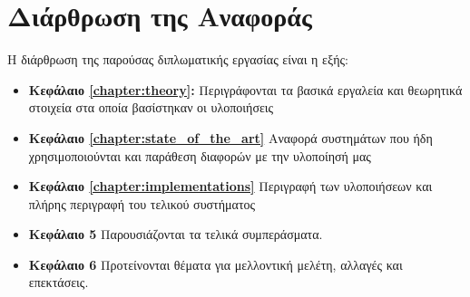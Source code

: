 \section{Διάρθρωση της Αναφοράς}
\label{section:layout}

Η διάρθρωση της παρούσας διπλωματικής εργασίας είναι η εξής:

\begin{itemize}
  \item{\textbf{Κεφάλαιο \ref{chapter:theory}:} 
		Περιγράφονται τα βασικά εργαλεία και θεωρητικά στοιχεία
		στα οποία βασίστηκαν οι υλοποιήσεις
    }
  \item{\textbf{Κεφάλαιο \ref{chapter:state_of_the_art}} Αναφορά συστημάτων που ήδη χρησιμοποιούνται	
		και παράθεση διαφορών με την υλοποίησή μας
    }
  \item{\textbf{Κεφάλαιο \ref{chapter:implementations}} Περιγραφή των υλοποιήσεων
  		και πλήρης περιγραφή του τελικού συστήματος
    }
  \item{\textbf{Κεφάλαιο 5} Παρουσιάζονται τα τελικά συμπεράσματα.
    }
  \item{\textbf{Κεφάλαιο 6} Προτείνονται θέματα για μελλοντική
      μελέτη, αλλαγές και επεκτάσεις.
    }
\end{itemize}
